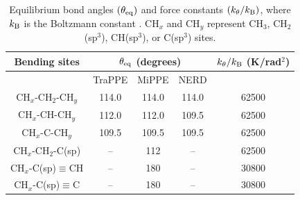 \documentclass[journal=jced,manuscript=article]{achemso}
\begin{document}

    \begin{table}[h!]
		\caption{Equilibrium bond angles $(\theta_{\rm eq})$ and force constants $(k_\theta/k_{\rm B})$, where $k_{\rm B}$ is the Boltzmann constant \cite{Martin1999,Nath2001,Potoff_branched,Barhaghi2017}. CH$_x$ and CH$_y$ represent CH$_3$, CH$_2$(sp$^3$), CH(sp$^3$), or C(sp$^3$) sites.} \label{tab:angles}
		\begin{center}
			\begin{tabular}{|c|c|c|c|c|}
				\hline
				Bending sites & \multicolumn{3}{|c|}{$\theta_{\rm eq}$ (degrees)} & $k_\theta/k_{\rm B}$ (K/rad$^2$) \\ \hline
				& TraPPE & MiPPE & NERD & \\ \hline
				CH$_x$-CH$_2$-CH$_y$ & 114.0 & 114.0 & 114.0 &  62500 \\ 
				CH$_x$-CH-CH$_y$ & 112.0 & 112.0 & 109.5 & 62500 \\
				CH$_x$-C-CH$_y$ & 109.5 & 109.5 & 109.5 & 62500 \\
				CH$_x$-CH$_2$-C(sp) & -- & 112 & -- & 62500 \\
				CH$_x$-C(sp)$\equiv$CH & -- & 180 & -- & 30800 \\
				CH$_x$-C(sp)$\equiv$C & -- & 180 & -- & 30800 \\
				\hline
			\end{tabular}
		\end{center} 
	\end{table}
    
\end{document}
